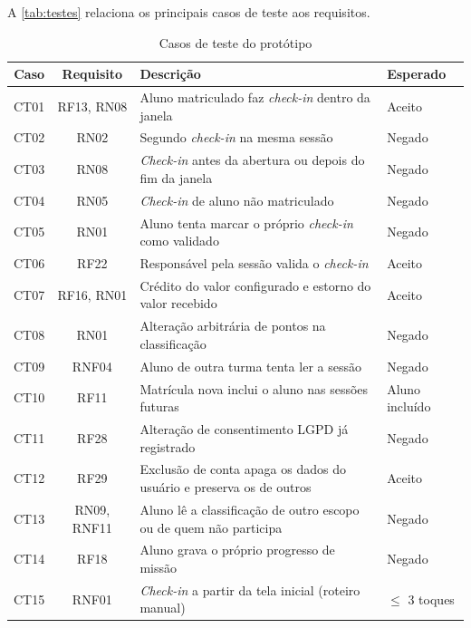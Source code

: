 A \autoref{tab:testes} relaciona os principais casos de teste aos
requisitos.

\begin{table}[!htb]
  \centering
  \caption{Casos de teste do protótipo}
  \label{tab:testes}
  \footnotesize
  \begin{tabular}{ccp{6.0cm}p{3.2cm}}
    \toprule
    \textbf{Caso} & \textbf{Requisito} & \textbf{Descrição} & \textbf{Esperado} \\
    \midrule
    CT01 & RF13, RN08 & Aluno matriculado faz \textit{check-in} dentro da janela & Aceito \\
    CT02 & RN02 & Segundo \textit{check-in} na mesma sessão & Negado \\
    CT03 & RN08 & \textit{Check-in} antes da abertura ou depois do fim da janela & Negado \\
    CT04 & RN05 & \textit{Check-in} de aluno não matriculado & Negado \\
    CT05 & RN01 & Aluno tenta marcar o próprio \textit{check-in} como validado & Negado \\
    CT06 & RF22 & Responsável pela sessão valida o \textit{check-in} & Aceito \\
    CT07 & RF16, RN01 & Crédito do valor configurado e estorno do valor recebido & Aceito \\
    CT08 & RN01 & Alteração arbitrária de pontos na classificação & Negado \\
    CT09 & RNF04 & Aluno de outra turma tenta ler a sessão & Negado \\
    CT10 & RF11 & Matrícula nova inclui o aluno nas sessões futuras & Aluno incluído \\
    CT11 & RF28 & Alteração de consentimento LGPD já registrado & Negado \\
    CT12 & RF29 & Exclusão de conta apaga os dados do usuário e preserva os de outros & Aceito \\
    CT13 & RN09, RNF11 & Aluno lê a classificação de outro escopo ou de quem não participa & Negado \\
    CT14 & RF18 & Aluno grava o próprio progresso de missão & Negado \\
    CT15 & RNF01 & \textit{Check-in} a partir da tela inicial (roteiro manual) & $\leq$ 3 toques \\
    \bottomrule
  \end{tabular}
\end{table}

